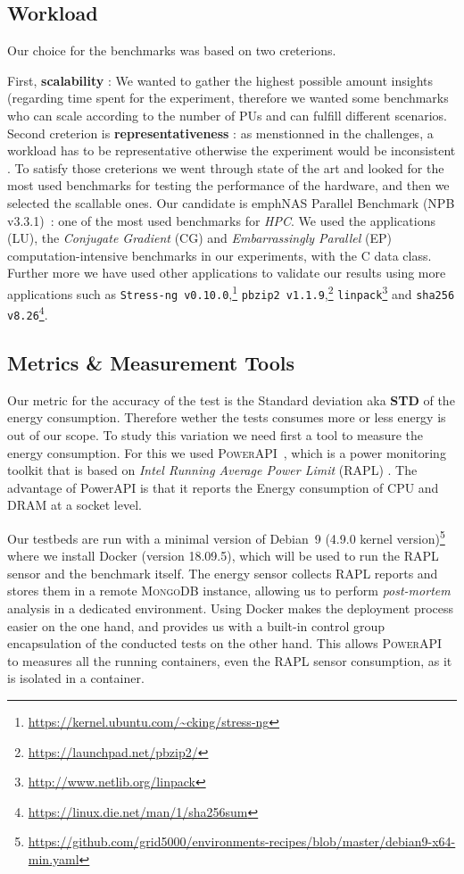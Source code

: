 \subsection{Workload}
Our choice for the benchmarks was based on two creterions.

First, \textbf{scalability} : We wanted to gather the highest possible amount insights (regarding time spent for the experiment, therefore we wanted some benchmarks who can scale according to the number of PUs and can fulfill different scenarios.
Second creterion is \textbf{representativeness} : as menstionned in the challenges, a workload has to be representative otherwise the experiment would be inconsistent \cite{stephen_evaluate_2012}.
To satisfy those creterions we went through state of the art and looked for the most used benchmarks for testing the performance of the hardware, and then we selected the scallable ones.
Our candidate is  emph{NAS Parallel Benchmark} (NPB v3.3.1)~\cite{Bailey:1991:NPB:125826.125925}: one of the most used benchmarks for \emph{HPC}. We used the applications (\textsf{LU}), the \emph{Conjugate Gradient} (\textsf{CG}) and \emph{Embarrassingly Parallel} (\textsf{EP}) computation-intensive benchmarks in our experiments, with the \textsf{C} data class.
Further more we have used other applications to validate our results using more applications such as \texttt{Stress-ng v0.10.0},\footnote{\url{https://kernel.ubuntu.com/~cking/stress-ng}} \texttt{pbzip2 v1.1.9},\footnote{\url{https://launchpad.net/pbzip2/}} \texttt{linpack}\footnote{\url{http://www.netlib.org/linpack}} and \texttt{sha256 v8.26}\footnote{\url{https://linux.die.net/man/1/sha256sum}}.


\subsection{Metrics \& Measurement Tools}
Our metric for the accuracy of the test is the Standard deviation aka \textbf{STD} of the energy consumption. Therefore wether the tests consumes more or less energy is out of our scope.
To study this variation we need first a tool to measure the energy consumption. For this we used \textsc{PowerAPI}~\cite{DBLP:journals/jss/ColmantRKSFS18}, which is a power monitoring toolkit that is based on \emph{Intel Running Average Power Limit} (RAPL) \cite{Khan:2018:RAE:3199681.3177754}. The advantage of PowerAPI is that it reports the Energy consumption of CPU and DRAM at a socket level.

Our testbeds are run with a minimal version of Debian \,9 (4.9.0 kernel version)\footnote{\url{https://github.com/grid5000/environments-recipes/blob/master/debian9-x64-min.yaml}} where we install Docker (version 18.09.5), which will be used to run the RAPL sensor and the benchmark itself.
The energy sensor collects RAPL reports and stores them in a remote \textsc{MongoDB} instance, allowing us to perform \emph{post-mortem} analysis in a dedicated environment.
Using Docker makes the deployment process easier on the one hand, and provides us with a built-in control group encapsulation of the conducted tests on the other hand.
This allows \textsc{PowerAPI} to measures all the running containers, even the RAPL sensor consumption, as it is isolated in a container.

